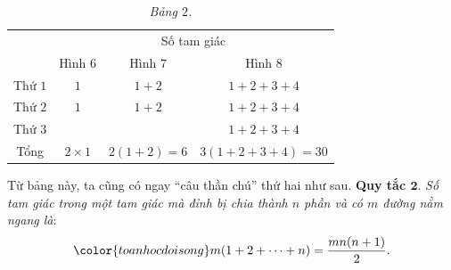 \begin{table}[H]
	\vspace*{-5pt}
\centering
\begin{tabular}{|c|c|c|c|}
	\hline
	\multirow{2}{5em}{\centering{Đường nằm ngang}}&\multicolumn{3}{c|}{Số tam giác}\\
	\cline{2-4}
	&Hình $6$&Hình $7$&Hình $8$\\
	\hline
	Thứ $1$ & $1$ &$1+2$& $1+2+3+4$\\
	\hline
	Thứ $2$ &$1$&$1+2$&$1+2+3+4$\\
	\hline
	Thứ $3$ &  & & $1+2+3+4$\\
	\hline
	Tổng &$2\times 1$ &$2(1+2)=6$&$3(1+2+3+4) = 30$\\
	\hline
\end{tabular}
\captionsetup{labelformat= empty, justification=centering}
\caption{\textit{\color{toancuabi}Bảng $2$.}}
\vspace*{-5pt}
\end{table}
	Từ bảng này, ta cũng có ngay “câu thần chú” thứ hai như sau.
	\vskip 0.1cm
	\textbf{\color{toancuabi}Quy tắc $\pmb{2.}$} \textit{Số tam giác trong một tam giác mà đỉnh bị chia thành $n$ phần và có $m$ đường nằm ngang là}:
	\begin{align*}
	\color{toanhocdoisong}m(1+2+\cdots+n) = \frac{mn(n+1)}{2}.
	\end{align*}
	\begin{figure}[H]
		\centering
		\vspace*{-5pt}
		\captionsetup{labelformat= empty, justification=centering}
		\captionsetup[subfigure]{labelformat=empty}
		\hfill{}\hfill
		\hfill
		\hfill
		\vspace*{-5pt}
	\end{figure} 
